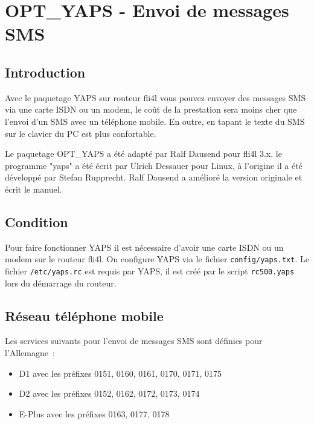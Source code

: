 \section {OPT\_YAPS - Envoi de messages SMS}

\subsection {Introduction}

Avec le paquetage YAPS sur routeur fli4l vous pouvez envoyer des messages
SMS via une carte ISDN ou un modem, le coût de la prestation sera moins cher
que l'envoi d'un SMS avec un téléphone mobile. En outre, en tapant le texte
du SMS sur le clavier du PC est plus confortable.

Le paquetage OPT\_YAPS a été adapté par Ralf Dausend pour fli4l 3.x. le programme
"yaps" a été écrit par Ulrich Dessauer pour Linux, à l'origine il a été développé
par Stefan Rupprecht. Ralf Dausend a amélioré la version originale et écrit le manuel.  

\subsection {Condition}

Pour faire fonctionner YAPS il est nécessaire d'avoir une carte ISDN ou un modem
sur le routeur fli4l. On configure YAPS via le fichier \texttt{config/yaps.txt}.
Le fichier \texttt{/etc/yaps.rc} est requis par YAPS, il est créé par le script
\texttt{rc500.yaps} lors du démarrage du routeur.


\subsection {Réseau téléphone mobile}

Les services suivants pour l'envoi de messages SMS sont définies pour l'Allemagne~:
\begin{itemize}
\item D1 avec les préfixes 0151, 0160, 0161, 0170, 0171, 0175
\item D2 avec les préfixes 0152, 0162, 0172, 0173, 0174
\item E-Plus avec les préfixes 0163, 0177, 0178
\end{itemize}

